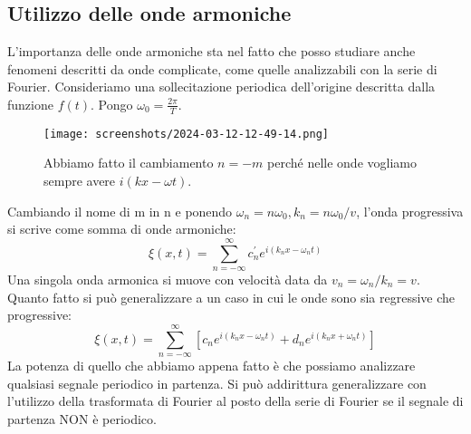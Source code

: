 \subsection{Utilizzo delle onde armoniche}

L'importanza delle onde armoniche sta nel fatto che posso studiare anche fenomeni descritti da onde complicate, come quelle analizzabili con la serie di Fourier. Consideriamo una sollecitazione periodica dell'origine descritta dalla funzione \(f(t)\). Pongo \(\omega _0 = \frac{2\pi }{T}\).
\begin{figure}[H]
	\centering
	\texttt{[image: screenshots/2024-03-12-12-49-14.png]}
	\caption{Abbiamo fatto il cambiamento \(n=-m\) perché nelle onde vogliamo sempre avere \(i(kx - \omega t)\).  }
\end{figure}
Cambiando il nome di m in n e ponendo \(\omega _n = n \omega _0, k_n = n \omega _0 / v\), l'onda progressiva si scrive come somma di onde armoniche:
\[
	\xi (x,t) = \sum_{n=-\infty }^{\infty} c^{\prime}_n e^{i(k_n x - \omega _n t)}
\]
Una singola onda armonica si muove con velocità data da \(v_n = \omega_n / k_n=v\). Quanto fatto si può generalizzare a un caso in cui le onde sono sia regressive che progressive:
\[
	\xi (x,t) = \sum_{n=-\infty }^{\infty} [c_n e^{i(k_n x - \omega _n t)} + d_n e^{i(k_n x + \omega _n t)}]
\]
La potenza di quello che abbiamo appena fatto è che possiamo analizzare qualsiasi segnale periodico in partenza. Si può addirittura generalizzare con l'utilizzo della trasformata di Fourier al posto della serie di Fourier se il segnale di partenza NON è periodico.